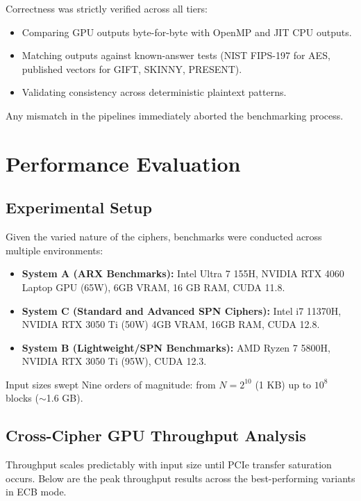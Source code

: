 \documentclass{article}
\begin{document}
Correctness was strictly verified across all tiers:
\begin{itemize}
    \item Comparing GPU outputs byte-for-byte with OpenMP and JIT CPU outputs.
    \item Matching outputs against known-answer tests (NIST FIPS-197 for AES, published vectors for GIFT, SKINNY, PRESENT).
    \item Validating consistency across deterministic plaintext patterns.
\end{itemize}
Any mismatch in the pipelines immediately aborted the benchmarking process.

\section{Performance Evaluation}

\subsection{Experimental Setup}
Given the varied nature of the ciphers, benchmarks were conducted across multiple environments:
\begin{itemize}
    \item \textbf{System A (ARX Benchmarks):} Intel Ultra 7 155H, NVIDIA RTX 4060 Laptop GPU (65W), 6GB VRAM, 16 GB RAM, CUDA 11.8.
    \item \textbf{System C (Standard and Advanced SPN Ciphers):} Intel i7 11370H, NVIDIA RTX 3050 Ti (50W) 4GB VRAM, 16GB RAM, CUDA 12.8.
    \item \textbf{System B (Lightweight/SPN Benchmarks):} AMD Ryzen 7 5800H, NVIDIA RTX 3050 Ti (95W), CUDA 12.3.
\end{itemize}
Input sizes swept Nine orders of magnitude: from $N = 2^{10}$ (1 KB) up to $10^8$ blocks ($\sim$1.6 GB).

\subsection{Cross-Cipher GPU Throughput Analysis}

Throughput scales predictably with input size until PCIe transfer saturation occurs. Below are the peak throughput results across the best-performing variants in ECB mode.
\end{document}
